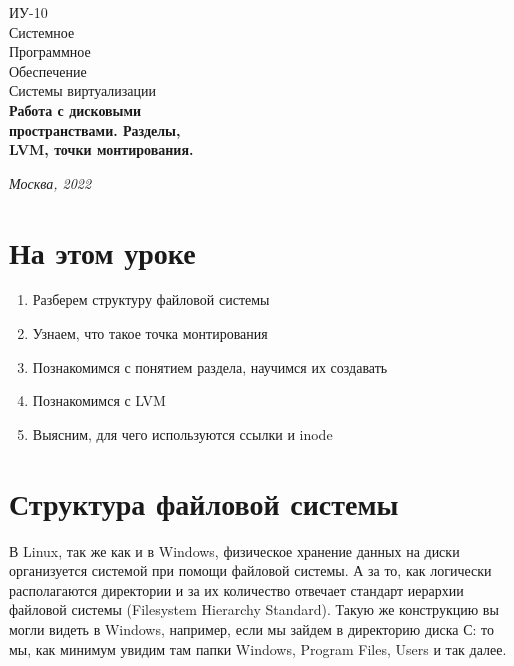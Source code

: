\documentclass[14pt, a4paper]{article}
\begin{document}
\begin{titlepage}
    \topmargin=216pt
    \newpage
    \hangindent=0.7cm
    \huge ИУ-10\\
    Системное\\
    Программное\\
    Обеспечение\\
    Системы виртуализации\\
    \textbf{Работа с дисковыми \\
    пространствами. Разделы, \\
    LVM, точки монтирования.}

    \vspace{10cm}

    \begin{center}
        \small\textit{Москва, 2022}
    \end{center}
\end{titlepage}

\section*{На этом уроке} 

\begin{enumerate}
    \item Разберем структуру файловой системы
    \item Узнаем, что такое точка монтирования
    \item Познакомимся с понятием раздела, научимся их создавать
    \item Познакомимся с LVM
    \item Выясним, для чего используются ссылки и inode
\end{enumerate}


\tableofcontents
\newpage

\section*{Структура файловой системы} 

В Linux, так же как и в Windows, физическое хранение данных на диски организуется системой при
помощи файловой системы. А за то, как логически располагаются директории и за их количество
отвечает стандарт иерархии файловой системы (Filesystem Hierarchy Standard). Такую же конструкцию
вы могли видеть в Windows, например, если мы зайдем в директорию диска С: то мы, как минимум
увидим там папки Windows, Program Files, Users и так далее.\\
\end{document}

